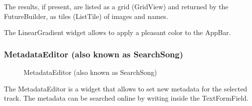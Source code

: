 \documentclass{article}
\begin{document}
The results, if present, are listed as a grid (GridView) and returned by the
FutureBuilder, as tiles (ListTile) of images and names.

The LinearGradient widget allows to apply a pleasant color to the AppBar.

\subsubsection{MetadataEditor (also known as SearchSong)}

\begin{figure}[H]
	\noindent
	\caption{MetadataEditor (also known as SearchSong)} 
\end{figure}

The MetadataEditor is a widget that allows to set new metadata for the selected
track. The metadata can be searched online by writing inside the TextFormField.
\end{document}
